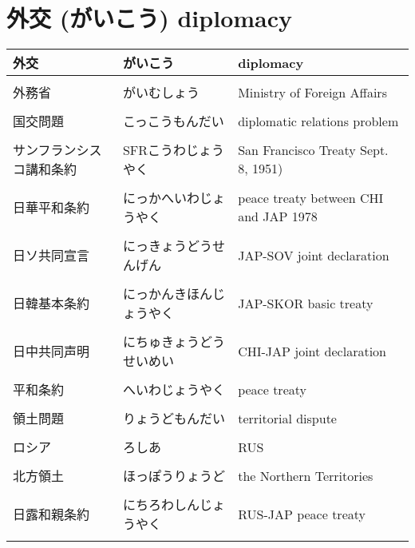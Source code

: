 \documentclass{article}
\begin{document}
\section{外交 (がいこう) diplomacy}
    \begin{tabular}{  l | l | p{7.5cm} }
 外交 			& がいこう 				& diplomacy   \\ \hline	\\[-1em]
 外務省			& がいむしょう			& Ministry of Foreign Affairs \\ \hline \\[-1em]
 国交問題			& こっこうもんだい			& diplomatic relations problem \\ \hline \\[-1em]
 サンフランシスコ講和条約  & SFRこうわじょうやく & San Francisco Treaty Sept. 8, 1951)\\ \hline \\[-1em]
 日華平和条約		& にっかへいわじょうやく  & peace treaty between CHI and JAP 1978\\ \hline \\[-1em]
 日ソ共同宣言				& にっきょうどうせんげん 	& JAP-SOV joint declaration \\ \hline \\[-1em]
 日韓基本条約				& にっかんきほんじょうやく	& JAP-SKOR basic treaty\\ \hline \\[-1em]
 日中共同声明				& にちゅきょうどうせいめい	& CHI-JAP joint declaration \\ \hline \\[-1em]
 平和条約					& へいわじょうやく 		& peace treaty \\ \hline \\[-1em]
 領土問題					& りょうどもんだい			& territorial dispute \\ \hline \\[-1em]
 ロシア					& ろしあ				& RUS	\\ \hline \\[-1em]
 北方領土					& ほっぽうりょうど 		& the Northern Territories\\ \hline \\[-1em]
 日露和親条約				& にちろわしんじょうやく		& RUS-JAP peace treaty\\ \hline \\[-1em]

\end{tabular}
\end{document}
